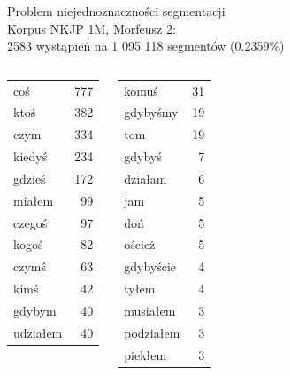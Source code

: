 \documentclass{beamer}
\begin{document}
\begin{frame}{Problem niejednoznaczności segmentacji}
  \\
  Korpus NKJP 1M, Morfeusz 2:\\
  2583 wystąpień na 1 095 118 segmentów (0.2359\%)
  \begin{columns}[c]
    \begin{center}
      \footnotesize
      \begin{tabular}{l|r}
        coś & 777 \\
        ktoś & 382 \\
        czym & 334 \\
        kiedyś & 234 \\
        gdzieś & 172 \\
        miałem & 99 \\
        czegoś & 97 \\
        kogoś & 82 \\
        czymś & 63 \\
        kimś & 42 \\
        gdybym & 40 \\
        udziałem & 40 \\
      \end{tabular}
    \end{center}
    \begin{center}
      \footnotesize
      \begin{tabular}{l|r}
        komuś & 31 \\
        gdybyśmy & 19 \\
        tom & 19 \\
        gdybyś & 7 \\
        działam & 6 \\
        jam & 5 \\
        doń & 5 \\
        oścież & 5 \\
        gdybyście & 4 \\
        tyłem & 4 \\
        musiałem & 3 \\
        podziałem & 3 \\
        piekłem & 3 \\
      \end{tabular}

\end{center}
\end{columns}
\end{frame}
\end{document}

